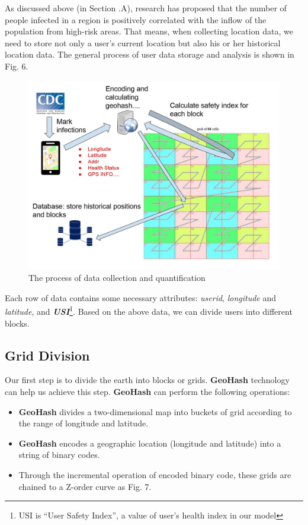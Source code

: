 \documentclass[conference]{IEEEtran}
\begin{document}
As discussed above (in Section \uppercase\expandafter{}.A), research has proposed that the number of people infected in a region is positively correlated with the inflow of the population from high-risk areas.
That means, when collecting location data, we need to store not only a user's current location but also his or her historical location data.
The general process of user data storage and analysis is shown in Fig. 6.
\begin{figure}[h]
    \centering\includegraphics[width=\linewidth]{process.jpg}
    \caption{The process of data collection and quantification}
\end{figure}

Each row of data contains some necessary attributes: \textit{userid}, \textit{longitude} and \textit{latitude}, and \textit{\textbf{USI}}\footnote{USI is ``User Safety Index'', a value of user's health index in our model}.
Based on the above data, we can divide users into different blocks.
\subsection{Grid Division}
Our first step is to divide the earth into blocks or grids. \textbf{GeoHash} technology can help us achieve this step.
\textbf{GeoHash} can perform the following operations:
\begin{itemize}
    \item \textbf{GeoHash} divides a two-dimensional map into buckets of grid according to the range of longitude and latitude.
    \item \textbf{GeoHash} encodes a geographic location (longitude and latitude) into a string of binary codes.
    \item Through the incremental operation of encoded binary code, these grids are chained to a Z-order curve as Fig. 7.
\end{itemize}
\end{document}
